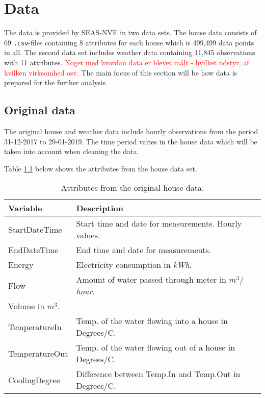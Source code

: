 \chapter{Data}
The data is provided by SEAS-NVE in two data sets. The house data consists of 69 \texttt{.csv}-files containing 8 attributes for each house which is 499,499 data points in all. The second data set includes weather data containing 11,845 observations with 11 attributes. \textcolor{red}{Noget med hvordan data er blevet målt - hvilket udstyr, af hvilken virksomhed osv.} 
The main focus of this section will be how data is prepared for the further analysis.

\section{Original data}
The original house and weather data include hourly observations from the period 31-12-2017 to 29-01-2019. The time period varies in the house data which will be taken into account when cleaning the data. 

Table \ref{tab: housedata} below shows the attributes from the house data set. 
\begin{table}[H]
    \centering
    \begin{tabular}{ll}
     \hline
     \textbf{Variable} & \textbf{Description} \\
    \hline
    \hline
    StartDateTime  &  Start time and date for measurements. Hourly values.\\
    EndDateTime  &  End time and date for measurements.\\
    Energy  &  Electricity consumption in \textit{kWh}.\\
    Flow  &  Amount of water passed through meter in \textit{$m^3/$hour}.\\
    Volume in $m^3$.\\
    TemperatureIn  &  Temp. of the water flowing into a house in Degrees/C. \\
    TemperatureOut  & Temp. of the water flowing out of a house in Degrees/C.\\
    CoolingDegree  &  Difference between Temp.In and Temp.Out in Degrees/C. \\
    \hline
    \end{tabular}
    \caption{Attributes from the original house data.}
    \label{tab: housedata}
\end{table}

